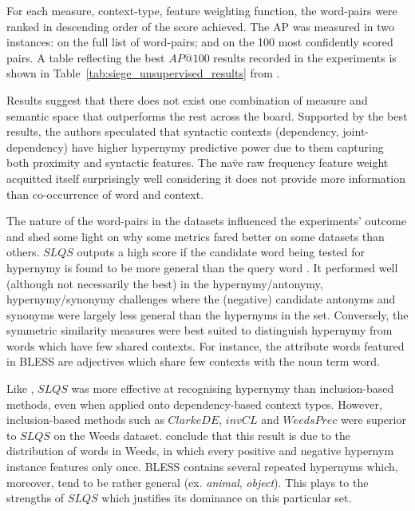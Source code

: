 For each measure, context-type, feature weighting function, the word-pairs were ranked in descending order of the score achieved.  The \ac{AP} was measured in two instances: on the full list of word-pairs; and on the 100 most confidently scored pairs.  A table reflecting the best $AP@100$ results recorded in the experiments is shown in Table~\ref{tab:siege_unsupervised_results} from \citet{shwartz2017siege}.

Results suggest that there does not exist one combination of measure and semantic space that outperforms the rest across the board.  Supported by the best results, the authors speculated that syntactic contexts (dependency, joint-dependency) have higher hypernymy predictive power due to them capturing both proximity and syntactic features.  The na\"ve raw frequency feature weight acquitted itself surprisingly well considering it does not provide more information than co-occurrence of word and context.

The nature of the word-pairs in the datasets influenced the experiments’ outcome and shed some light on why some metrics fared better on some datasets than others.  $SLQS$ outputs a high score if the candidate word being tested for hypernymy is found to be more general than the query word \citep{santus2014chasing}.  It performed well (although not necessarily the best) in the hypernymy/antonymy, hypernymy/synonymy challenges where the (negative) candidate antonyms and synonyms were largely less general than the hypernyms in the set.  Conversely, the symmetric similarity measures were best suited to distinguish hypernymy from words which have few shared contexts.  For instance, the attribute words featured in BLESS are adjectives which share few contexts with the noun term word.  

Like \citep{santus2014chasing}, $SLQS$ was more effective at recognising hypernymy than inclusion-based methods, even when applied onto dependency-based context types.  However, inclusion-based methods such as $ClarkeDE$, $invCL$ and $WeedsPrec$ were superior to $SLQS$ on the Weeds dataset.  \citeauthor{shwartz2017siege} conclude that this result is due to the distribution of words in Weeds, in which every positive and negative hypernym instance features only once.  BLESS contains several repeated hypernyms which, moreover, tend to be rather general (ex. \textit{animal}, \textit{object}).  This plays to the strengths of $SLQS$ which justifies its dominance on this particular set.

